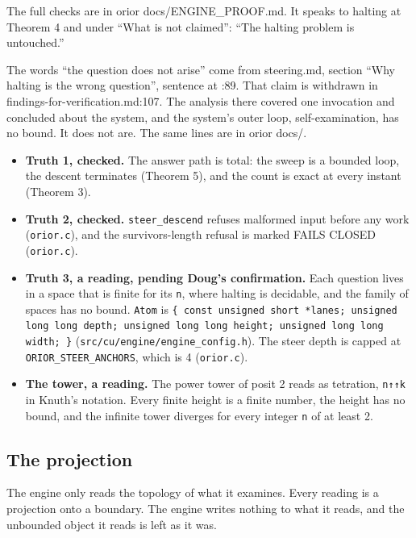 The full checks are in orior docs/ENGINE\_\allowbreak{}PROOF.md. It speaks to halting at Theorem 4 and under “What is not claimed”: “The halting problem is untouched.”

The words “the question does not arise” come from steering.md, section “Why halting is the wrong question”, sentence at :89. That claim is withdrawn in findings-for-verification.md:107. The analysis there covered one invocation and concluded about the system, and the system's outer loop, self-examination, has no bound. It does not are. The same lines are in orior docs/.

\begin{itemize}
\item \textbf{Truth 1, checked.} The answer path is total: the sweep is a bounded loop, the descent terminates (Theorem 5), and the count is exact at every instant (Theorem 3).
\item \textbf{Truth 2, checked.} \texttt{steer\_\allowbreak{}descend} refuses malformed input before any work (\texttt{orior.\allowbreak{}c}), and the survivors-length refusal is marked FAILS CLOSED (\texttt{orior.\allowbreak{}c}).
\item \textbf{Truth 3, a reading, pending Doug's confirmation.} Each question lives in a space that is finite for its \texttt{n}, where halting is decidable, and the family of spaces has no bound. \texttt{Atom} is \texttt{\{ const unsigned short *lanes; unsigned long long depth; unsigned long long height; unsigned long long width; \}} (\texttt{src/\allowbreak{}cu/\allowbreak{}engine/\allowbreak{}engine\_\allowbreak{}config.\allowbreak{}h}). The steer depth is capped at \texttt{ORIOR\_\allowbreak{}STEER\_\allowbreak{}ANCHORS}, which is 4 (\texttt{orior.\allowbreak{}c}).
\item \textbf{The tower, a reading.} The power tower of posit 2 reads as tetration, \texttt{n↑↑k} in Knuth's notation. Every finite height is a finite number, the height has no bound, and the infinite tower diverges for every integer \texttt{n} of at least 2.
\end{itemize}

\subsection{\texorpdfstring{The projection}{The projection}}

The engine only reads the topology of what it examines. Every reading is a projection onto a boundary. The engine writes nothing to what it reads, and the unbounded object it reads is left as it was.

